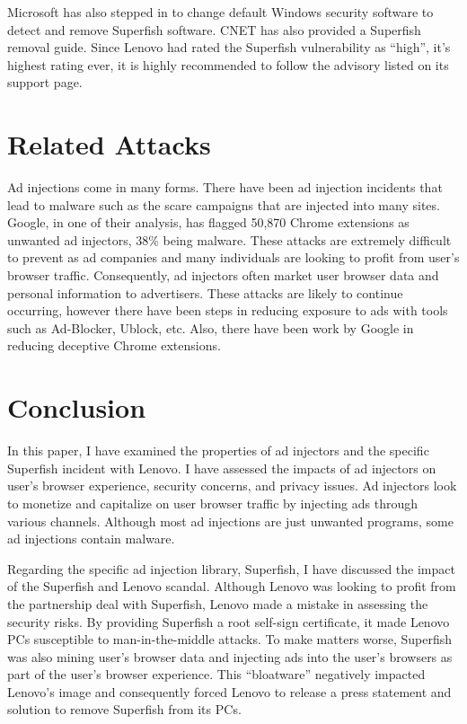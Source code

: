 \documentclass[journal]{IEEEtran}
\begin{document}
Microsoft has also stepped in to change default Windows security software to detect and remove Superfish software\cite{cnet_lenovo}. CNET has also provided a Superfish removal guide. Since Lenovo had rated the Superfish vulnerability as ``high'', it's highest rating ever, it is highly recommended to follow the advisory listed on its support page\cite{lenovo_superfish}.

\section{Related Attacks}
Ad injections come in many forms. There have been ad injection incidents that lead to malware such as the scare campaigns that are injected into many sites. Google, in one of their analysis, has flagged 50,870 Chrome extensions as unwanted ad injectors, 38\% being malware. These attacks are extremely difficult to prevent as ad companies and many individuals are looking to profit from user's browser traffic. Consequently, ad injectors often market user browser data and personal information to advertisers\cite{ad_inject}. These attacks are likely to continue occurring, however there have been steps in reducing exposure to ads with tools such as Ad-Blocker, Ublock, etc. Also, there have been work by Google in reducing deceptive Chrome extensions\cite{ad_inject}.

\section{Conclusion}
In this paper, I have examined the properties of ad injectors and the specific Superfish incident with Lenovo. I have assessed the impacts of ad injectors on user's browser experience, security concerns, and privacy issues. Ad injectors look to monetize and capitalize on user browser traffic by injecting ads through various channels. Although most ad injections are just unwanted programs, some ad injections contain malware. 

Regarding the specific ad injection library, Superfish, I have discussed the impact of the Superfish and Lenovo scandal. Although Lenovo was looking to profit from the partnership deal with Superfish, Lenovo made a mistake in assessing the security risks. By providing Superfish a root self-sign certificate, it made Lenovo PCs susceptible to man-in-the-middle attacks. To make matters worse, Superfish was also mining user's browser data and injecting ads into the user's browsers as part of the user's browser experience. This ``bloatware'' negatively impacted Lenovo's image and consequently forced Lenovo to release a press statement and solution to remove Superfish from its PCs.
\end{document}
